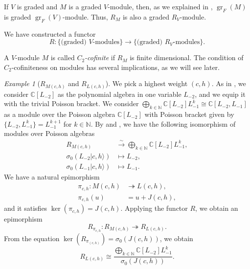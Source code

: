 \documentclass[a4paper, 12pt, reqno]{amsart}
\theoremstyle{remark}
\newtheorem{example}[theorem]{Example}
\DeclareMathOperator{\gr}{gr}
\begin{document}
If $V$ is graded and $M$ is a graded $V$-module, then, as we explained in , $\gr_F(M)$ is graded $\gr_F(V)$-module.
Thus, $R_M$ is also a graded $R_V$-module.

We have constructed a functor
\begin{equation*}
  R: \{\text{(graded) $V$-modules}\} \to \{\text{(graded) $R_V$-modules}\}.
\end{equation*}

A $V$-module $M$ is called \emph{$C_2$-cofinite} if $R_M$ is finite dimensional.
The condition of $C_2$-cofiniteness on modules has several implications, as we will see later.

\begin{example}[$R_{M(c, h)}$ and $R_{L(c, h)}$]
  \label{exa:20}
  We pick a highest weight $(c, h)$.
  As in , we consider $\mathbb{C}[L_{-2}]$ as the polynomial algebra in one variable $L_{-2}$, and we equip it with the trivial Poisson bracket.
  We consider $\bigoplus_{k \in \mathbb{N}}\mathbb{C}[L_{-2}]L_{-1}^k \cong \mathbb{C}[L_{-2}, L_{-1}]$ as a module over the Poisson algebra $\mathbb{C}[L_{-2}]$ with Poisson bracket given by $\{L_{-2}, L_{-1}^k\} = L_{-1}^{k + 1}$ for $k \in \mathbb{N}$.
  By  and , we have the following isomorphism of modules over Poisson algebras
  \begin{align*}
    R_{M(c, h)} &\xrightarrow{\sim} \bigoplus_{k \in \mathbb{N}}\mathbb{C}[L_{-2}]L_{-1}^k, \\
    \sigma_0(L_{-2}|c, h\rangle) &\mapsto L_{-2}, \\
    \sigma_0(L_{-1}|c, h\rangle) &\mapsto L_{-1}.
  \end{align*}
  We have a natural epimorphism
  \begin{align*}
    \pi_{c, h}: M(c, h) &\twoheadrightarrow L(c, h), \\
    \pi_{c, h}(u) &= u + J(c, h),
  \end{align*}
  and it satisfies $\ker(\pi_{c, h}) = J(c, h)$.
  Applying the functor $R$, we obtain an epimorphism
  \begin{equation*}
    R_{\pi_{c, h}}: R_{M(c, h)} \twoheadrightarrow R_{L(c, h)}.
  \end{equation*}
  From the equation $\ker(R_{\pi_{(c, h)}}) = \sigma_0(J(c, h))$, we obtain
  \begin{equation*}
    R_{L(c, h)} \cong \frac{\bigoplus_{k \in \mathbb{N}}\mathbb{C}[L_{-2}]L_{-1}^k}{\sigma_0(J(c, h))}.
  \end{equation*}
\end{example}
\end{document}
